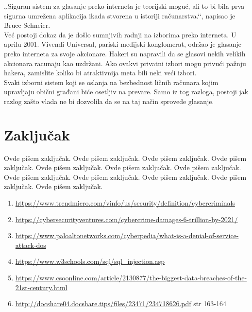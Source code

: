 \documentclass[a4paper]{article}
\begin{document}
,,Siguran sistem za glasanje preko interneta je teorijski moguć, ali to bi bila prva sigurna umrežena aplikacija ikada stvorena u istoriji računarstva.‘‘, napisao je Bruce Schneier.\\
\indent Već postoji dokaz da je došlo sumnjivih radnji na izborima preko interneta. U aprilu 2001. Vivendi Universal, pariski medijski konglomerat, održao je glasanje preko interneta za svoje akcionare. Hakeri su napravili da se glasovi nekih velikih akcionara racunaju kao uzdržani. Ako ovakvi privatni izbori mogu privući pažnju hakera, zamislite koliko bi atraktivnija meta bili neki veći izbori.\\
\indent Svaki izborni sistem koji se oslanja na bezbednost ličnih računara kojim upravljaju obični građani biće osetljiv na prevare. Samo iz tog razloga, postoji jak razlog zašto vlada ne bi dozvolila da se na taj način sprovede glasanje.

\section{Zaključak}
\label{sec:zakljucak}

Ovde pišem zaključak. 
Ovde pišem zaključak. 
Ovde pišem zaključak. 
Ovde pišem zaključak. 
Ovde pišem zaključak. 
Ovde pišem zaključak. 
Ovde pišem zaključak. 
Ovde pišem zaključak. 
Ovde pišem zaključak. 
Ovde pišem zaključak. 
Ovde pišem zaključak. 
Ovde pišem zaključak.

 

\appendix
 

\begin{enumerate}
\item \url{https://www.trendmicro.com/vinfo/us/security/definition/cybercriminals}
\item \url{https://cybersecurityventures.com/cybercrime-damages-6-trillion-by-2021/} 
\item \url{https://www.paloaltonetworks.com/cyberpedia/what-is-a-denial-of-service-attack-dos}
\item \url{https://www.w3schools.com/sql/sql_injection.asp}
\item \url{https://www.csoonline.com/article/2130877/the-biggest-data-breaches-of-the-21st-century.html}
\item \url{http://docshare04.docshare.tips/files/23471/234718626.pdf} str 163-164
\end{enumerate}
\end{document}
